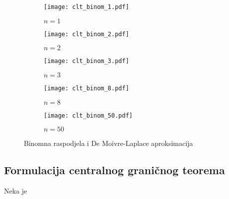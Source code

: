 \begin{figure}[H]
  \centering
  \begin{subfigure}[b]{0.3\textwidth}
    \centering
    \texttt{[image: clt\_binom\_1.pdf]}
    \caption{$n=1$}
    \label{fig:binom:a}
  \end{subfigure}
  \vspace{10pt}
	\begin{subfigure}[b]{0.3\textwidth}
		\centering
    \texttt{[image: clt\_binom\_2.pdf]}
    \caption{$n=2$}
    \label{fig:binom:b}
	\end{subfigure}
	\begin{subfigure}[b]{0.3\textwidth}
		\centering
    \texttt{[image: clt\_binom\_3.pdf]}
    \caption{$n=3$}
    \label{fig:binom:c}
	\end{subfigure}
	\begin{subfigure}[b]{0.3\textwidth}
		\centering
    \texttt{[image: clt\_binom\_8.pdf]}
    \caption{$n=8$}
    \label{fig:binom:d}
	\end{subfigure}
	\begin{subfigure}[b]{0.3\textwidth}
		\centering
    \texttt{[image: clt\_binom\_50.pdf]}
    \caption{$n=50$}
    \label{fig:binom:e}
	\end{subfigure}
	\caption{Binomna raspodjela i De Moivre-Laplace aproksimacija}
  \label{fig:binom}
\end{figure}

\subsection{Formulacija centralnog graničnog teorema}

\begin{theorem}
  Neka je 
\end{theorem}

